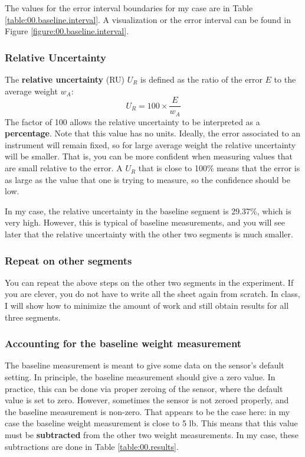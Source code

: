 The values for the error interval boundaries for my case are in Table \ref{table:00.baseline.interval}. A visualization or the error interval can be found in Figure \ref{figure:00.baseline.interval}.
\subsubsection{Relative Uncertainty}
The \textbf{relative uncertainty} (RU) $U_{R}$ is defined as the ratio of the error $E$ to the average weight $w_{A}$:
\begin{equation}
    U_{R} = 100 \times \frac{E}{w_{A}}
\end{equation}
The factor of 100 allows the relative uncertainty to be interpreted as a \textbf{percentage}. Note that this value has no units. Ideally, the error associated to an instrument will remain fixed, so for large average weight the relative uncertainty will be smaller. That is, you can be more confident when measuring values that are small relative to the error. A $U_{R}$ that is close to 100\% means that the error is as large as the value that one is trying to measure, so the confidence should be low.

In my case, the relative uncertainty in the baseline segment is 29.37\%, which is very high. However, this is typical of baseline measurements, and you will see later that the relative uncertainty with the other two segments is much smaller.
\subsubsection{Repeat on other segments}
You can repeat the above steps on the other two segments in the experiment. If you are clever, you do not have to write all the sheet again from scratch. In class, I will show how to minimize the amount of work and still obtain results for all three segments.
\subsubsection{Accounting for the baseline weight measurement}
The baseline measurement is meant to give some data on the sensor's default setting. In principle, the baseline measurement should give a zero value. In practice, this can be done via proper zeroing of the sensor, where the default value is set to zero. However, sometimes the sensor is not zeroed properly, and the baseline measurement is non-zero. That appears to be the case here: in my case the baseline weight measurement is close to 5 lb. This means that this value must be \textbf{subtracted} from the other two weight measurements. In my case, these subtractions are done in Table \ref{table:00.results}.
